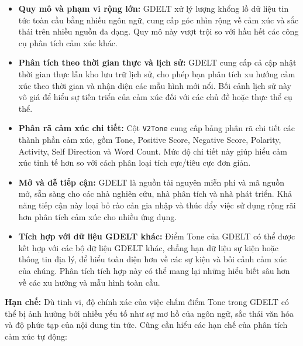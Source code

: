 \begin{itemize}
\item
  \textbf{Quy mô và phạm vi rộng lớn:} GDELT xử lý lượng khổng lồ dữ liệu tin tức toàn cầu bằng nhiều ngôn ngữ, cung cấp góc nhìn rộng về cảm xúc và sắc thái trên nhiều nguồn đa dạng. Quy mô này vượt trội so với hầu hết các công cụ phân tích cảm xúc khác.
\item
  \textbf{Phân tích theo thời gian thực và lịch sử:} GDELT cung cấp cả cập nhật thời gian thực lẫn kho lưu trữ lịch sử, cho phép bạn phân tích xu hướng cảm xúc theo thời gian và nhận diện các mẫu hình mới nổi. Bối cảnh lịch sử này vô giá để hiểu sự tiến triển của cảm xúc đối với các chủ đề hoặc thực thể cụ thể.
\item
  \textbf{Phân rã cảm xúc chi tiết:} Cột \texttt{V2Tone} cung cấp bảng phân rã chi tiết các thành phần cảm xúc, gồm Tone, Positive Score, Negative Score, Polarity, Activity, Self Direction và Word Count. Mức độ chi tiết này giúp hiểu cảm xúc tinh tế hơn so với cách phân loại tích cực/tiêu cực đơn giản.
\item
  \textbf{Mở và dễ tiếp cận:} GDELT là nguồn tài nguyên miễn phí và mã nguồn mở, sẵn sàng cho các nhà nghiên cứu, nhà phân tích và nhà phát triển. Khả năng tiếp cận này loại bỏ rào cản gia nhập và thúc đẩy việc sử dụng rộng rãi hơn phân tích cảm xúc cho nhiều ứng dụng.
\item
  \textbf{Tích hợp với dữ liệu GDELT khác:} Điểm Tone của GDELT có thể được kết hợp với các bộ dữ liệu GDELT khác, chẳng hạn dữ liệu sự kiện hoặc thông tin địa lý, để hiểu toàn diện hơn về các sự kiện và bối cảnh cảm xúc của chúng. Phân tích tích hợp này có thể mang lại những hiểu biết sâu hơn về các xu hướng và mẫu hình toàn cầu.
\end{itemize}

\textbf{Hạn chế:} Dù tinh vi, độ chính xác của việc chấm điểm Tone trong GDELT có thể bị ảnh hưởng bởi nhiều yếu tố như sự mơ hồ của ngôn ngữ, sắc thái văn hóa và độ phức tạp của nội dung tin tức. Cũng cần hiểu các hạn chế của phân tích cảm xúc tự động:

